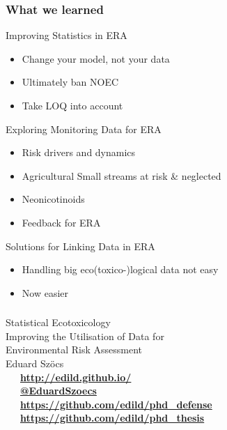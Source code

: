 \documentclass[10pt
	]{beamer}
\begin{document}
\begin{frame}
\frametitle{What we learned}
	\begin{exampleblock}{\checkmark Improving Statistics in ERA}
		\begin{itemize}
			\item Change your model, not your data
			\item Ultimately ban NOEC
			\item Take LOQ into account
		\end{itemize}
	\end{exampleblock}

\pause
	\begin{exampleblock}{\checkmark Exploring Monitoring Data for ERA}
		\begin{itemize}
			\item Risk drivers and dynamics
			\item Agricultural Small streams at risk \& neglected
			\item Neonicotinoids
			\item Feedback for ERA
		\end{itemize}
	\end{exampleblock}

\pause
	\begin{exampleblock}{\checkmark Solutions for Linking Data in ERA}
		\begin{itemize}
			\item Handling big eco(toxico-)logical data not easy
			\item Now easier
		\end{itemize}
	\end{exampleblock}


\end{frame}


\begin{frame}[standout]
	\frametitle{}

	\vspace{1em}
	\Huge{Statistical Ecotoxicology} \\[0.3em]
	\large{Improving the Utilisation of Data for \\ Environmental Risk Assessment} \\[1em]

	\normalsize
	Eduard Szöcs \\[3em]

	\faLaptop~~~\textbf{\href{http://edild.github.io/}{http://edild.github.io/ }}\\[.5em]
	\faTwitter~~~\textbf{\href{http://twitter.com/EduardSzoecs}{@EduardSzoecs}} 	\\[0.5em]
	\faFilePowerpointO~~~\textbf{\href{https://github.com/edild/phd_defense}{https://github.com/edild/phd\_defense}}\\[0.5em]
	\faBook~~~\textbf{\href{https://github.com/edild/phd_thesis}{https://github.com/edild/phd\_thesis}}\\[3em]

	\begin{center}\ccbysa\end{center} 

\end{frame}
\end{document}
